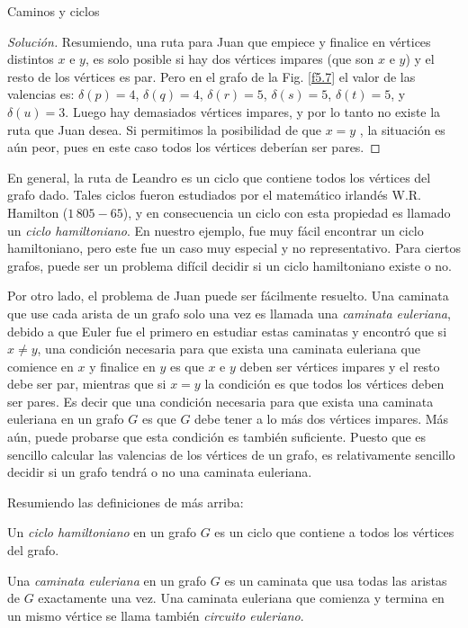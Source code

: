 \begin{section}{Caminos y ciclos}
\begin{ejemplo}
\begin{proof}[Solución]
    Resumiendo, una ruta para Juan que empiece y finalice en vértices distintos $x$ e $y$, es solo posible si hay dos vértices impares (que son $x$ e $y$) y el resto de los vértices es par.  Pero en el grafo de la Fig. \ref{f5.7} el valor de las valencias es: $\delta(p)=4$, $\delta(q)=4$, $\delta(r)=5$, $\delta(s)=5$, $\delta(t)=5$, y $\delta(u)=3$. Luego hay demasiados vértices impares, y por lo tanto no existe la ruta que Juan desea. Si permitimos la posibilidad de que $x=y$ , la situación es aún peor, pues en este caso todos los vértices deberían ser pares.
\end{proof}
\end{ejemplo}

En general, la ruta de Leandro es un ciclo que contiene todos los vértices del grafo dado. Tales ciclos fueron estudiados por el matemático irlandés W.R. Hamilton ($1\,805-65$),   y en consecuencia un ciclo con esta propiedad es llamado un \textit{ciclo hamiltoniano}. En nuestro ejemplo, fue muy fácil  encontrar un ciclo hamiltoniano, pero este fue un caso muy especial y no representativo. Para ciertos grafos, puede ser un problema difícil decidir si un ciclo hamiltoniano existe o no.

Por otro lado, el problema de Juan puede ser fácilmente resuelto. Una caminata que use cada arista de un grafo solo una vez es llamada una \textit{caminata euleriana}, debido a que Euler  fue el primero en estudiar estas caminatas y encontró que si $x\not= y$, una condición necesaria para que exista una caminata euleriana que comience en $x$ y finalice en $y$ es que $x$ e $y$ deben ser vértices impares y el resto debe ser par, mientras que si $x=y$ la condición es que todos los vértices deben ser pares. Es decir que una condición necesaria para que exista una caminata euleriana en un grafo $G$
es que $G$ debe tener a lo más dos vértices impares. Más aún, puede probarse que esta condición es también suficiente. Puesto que es sencillo calcular las valencias de los vértices de un grafo, es relativamente sencillo decidir si un grafo tendrá o no una caminata euleriana. 

Resumiendo las definiciones de más arriba:

\begin{definicion}
Un \textit{ciclo hamiltoniano} en un grafo $G$ es un ciclo que contiene a todos los vértices del grafo.

Una \textit{caminata euleriana} en un grafo $G$ es un caminata que usa todas las aristas de $G$ exactamente
una vez. Una caminata euleriana que comienza y termina en un mismo vértice se llama también \textit{circuito euleriano}.
\end{definicion}


\end{section}
